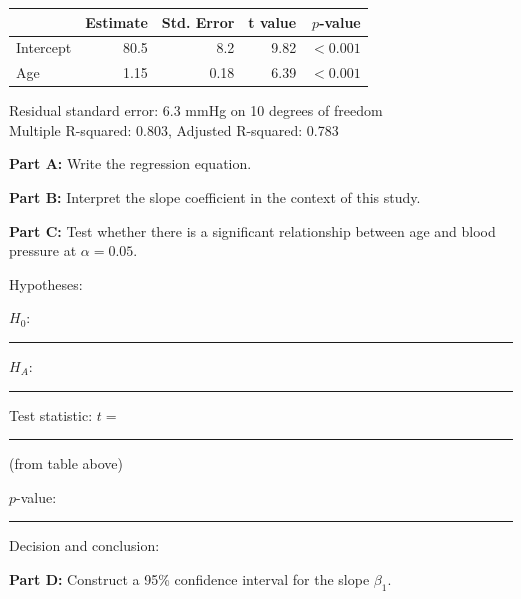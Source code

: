 \documentclass[11pt]{article}
\begin{document}
\vspace{0.3cm}

\begin{center}
\begin{tabular}{lrrrr}
\toprule
& Estimate & Std. Error & t value & $p$-value \\
\midrule
Intercept & 80.5 & 8.2 & 9.82 & $<0.001$ \\
Age & 1.15 & 0.18 & 6.39 & $<0.001$ \\
\bottomrule
\end{tabular}
\end{center}

Residual standard error: 6.3 mmHg on 10 degrees of freedom\\
Multiple R-squared: 0.803, Adjusted R-squared: 0.783

\vspace{0.5cm}

\textbf{Part A:} Write the regression equation.

\vspace{2cm}

\textbf{Part B:} Interpret the slope coefficient in the context of this study.

\vspace{3cm}

\textbf{Part C:} Test whether there is a significant relationship between age and blood pressure at $\alpha = 0.05$.

\vspace{0.3cm}

Hypotheses:

$H_0$: \rule{5cm}{0.4pt}

$H_A$: \rule{5cm}{0.4pt}

\vspace{0.5cm}

Test statistic: $t = $ \rule{3cm}{0.4pt} (from table above)

\vspace{0.5cm}

$p$-value: \rule{3cm}{0.4pt}

\vspace{0.5cm}

Decision and conclusion:

\vspace{2.5cm}

\newpage

\textbf{Part D:} Construct a 95\% confidence interval for the slope $\beta_1$.

\vspace{0.3cm}
\end{document}
